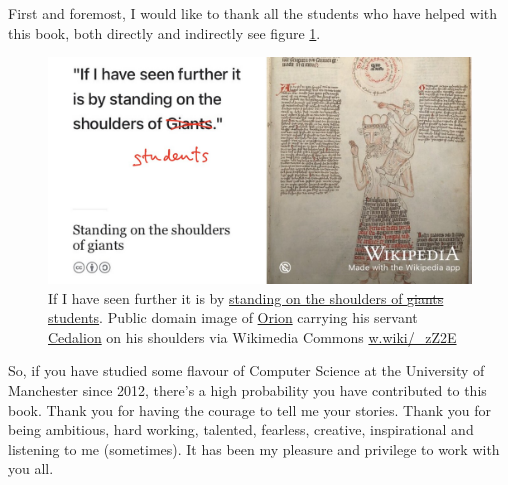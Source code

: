 \documentclass[
]{book}
\begin{document}
First and foremost, I would like to thank all the students who have helped with this book, both directly and indirectly see figure \ref{fig:giants-fig}.

\begin{figure}

{\centering \includegraphics[width=1\linewidth]{images/standing-on-the-shoulders-of-students} 

}

\caption{If I have seen further it is by \href{https://en.wikipedia.org/wiki/Standing_on_the_shoulders_of_giants}{standing on the shoulders of \sout{giants} students}. \citep{newton} Public domain image of \href{https://en.wikipedia.org/wiki/Orion_(mythology)}{Orion} carrying his servant \href{https://en.wikipedia.org/wiki/Cedalion}{Cedalion} on his shoulders via Wikimedia Commons \href{https://w.wiki/_zZ2E}{w.wiki/\_zZ2E}}\label{fig:giants-fig}
\end{figure}



So, if you have studied some flavour of Computer Science at the University of Manchester since 2012, there's a high probability you have contributed to this book. Thank you for having the courage to tell me your stories. Thank you for being ambitious, hard working, talented, fearless, creative, inspirational and listening to me (sometimes). It has been my pleasure and privilege to work with you all.
\end{document}
